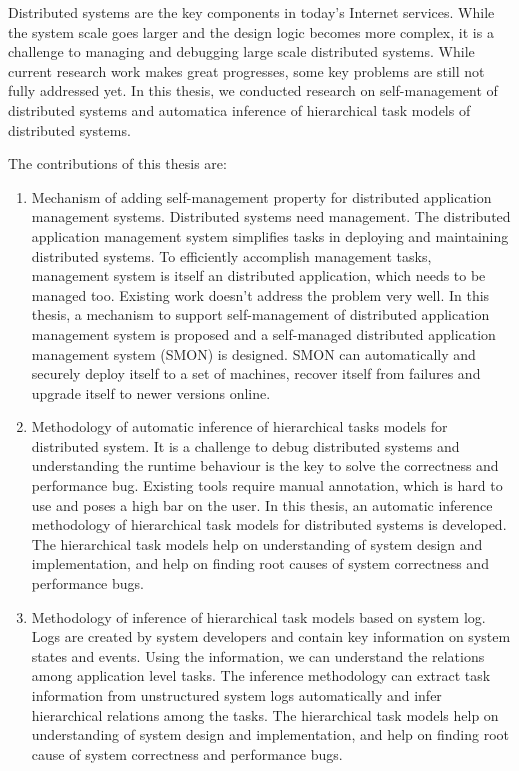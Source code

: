 \begin{eabstract}
  Distributed systems are the key components in today's Internet
  services. While the system scale goes larger and the design
  logic becomes more complex, it is a challenge to managing and
  debugging large scale distributed systems. While current research
  work makes great progresses, some key problems are still not fully
  addressed yet. In this thesis, we conducted research on
  self-management of distributed systems and automatica inference
  of hierarchical task models of distributed systems.

  The contributions of this thesis are:

  \begin{enumerate}

    \item Mechanism of adding self-management property for distributed
    application management systems. Distributed systems need
    management. The distributed application management system
    simplifies tasks in deploying and maintaining distributed systems.
    To efficiently accomplish management tasks, management system is
    itself an distributed application, which needs to be managed too.
    Existing work doesn't address the problem very well. In this
    thesis, a mechanism to support self-management of distributed
    application management system is proposed and a self-managed
    distributed application management system (SMON) is designed. SMON
    can automatically and securely deploy itself to a set of machines,
    recover itself from failures and upgrade itself to
    newer versions online.

    \item Methodology of automatic inference of hierarchical tasks
    models for distributed system. It is a challenge to debug
    distributed systems and understanding the runtime behaviour is the
    key to solve the correctness and performance bug. Existing tools
    require manual annotation, which is hard to use and poses a high
    bar on the user. In this thesis, an automatic inference
    methodology of hierarchical task models for distributed systems is
    developed. The hierarchical task models help on understanding of
    system design and implementation, and help on finding root causes
    of system correctness and performance bugs.

    \item Methodology of inference of hierarchical task models based
    on system log. Logs are created by system developers and contain
    key information on system states and events. Using the
    information, we can understand the relations among application
    level tasks. The inference methodology can extract task
    information from unstructured system logs automatically and
    infer hierarchical relations among the tasks. The
    hierarchical task models help on understanding of system design
    and implementation, and help on finding root cause of system
    correctness and performance bugs.

  \end{enumerate}

\end{eabstract}

